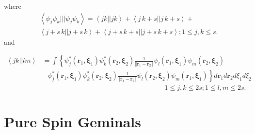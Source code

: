 \documentclass[aps,preprint]{revtex4}%
\begin{document}
where%
\begin{align*}
&  \left\langle \psi_{j}\psi_{k}|||\psi_{j}\psi_{k}\right\rangle =\left\langle
jk||jk\right\rangle +\left\langle j\,k+s||j\,k+s\right\rangle +\\
&  \left\langle j+s\,k||j+s\,k\right\rangle +\left\langle
j+s\,k+s||j+s\,k+s\right\rangle ;1\leq j,k\leq s.
\end{align*}
and%

\begin{align*}
\left\langle jk||lm\right\rangle  &  =\int\left\{  \psi_{j}^{\ast}\left(
\mathbf{r}_{1}\mathbf{,\xi}_{1}\right)  \psi_{k}^{\ast}\left(  \mathbf{r}%
_{2}\mathbf{,\xi}_{2}\right)  \frac{1}{\left\Vert \mathbf{r}_{1}%
-\mathbf{r}_{2}\right\Vert }\psi_{l}\left(  \mathbf{r}_{1}\mathbf{,\xi}%
_{1}\right)  \psi_{m}\left(  \mathbf{r}_{2}\mathbf{,\xi}_{2}\right)  \right.
\\
&  -\left.  \psi_{j}^{\ast}\left(  \mathbf{r}_{1}\mathbf{,\xi}_{1}\right)
\psi_{k}^{\ast}\left(  \mathbf{r}_{2}\mathbf{,\xi}_{2}\right)  \frac
{1}{\left\Vert \mathbf{r}_{1}-\mathbf{r}_{2}\right\Vert }\psi_{l}\left(
\mathbf{r}_{2}\mathbf{,\xi}_{2}\right)  \psi_{m}\left(  \mathbf{r}%
_{1}\mathbf{,\xi}_{1}\right)  \right\}  d\mathbf{r}_{1}d\mathbf{r}_{2}d\xi
_{1}d\xi_{2}\\
&  \left.  {}\right.  \qquad\qquad\qquad\qquad\qquad\qquad\qquad\qquad
\qquad1\leq j,k\leq2s;1\leq l,m\leq2s.
\end{align*}


\section{Pure Spin Geminals}
\end{document}
